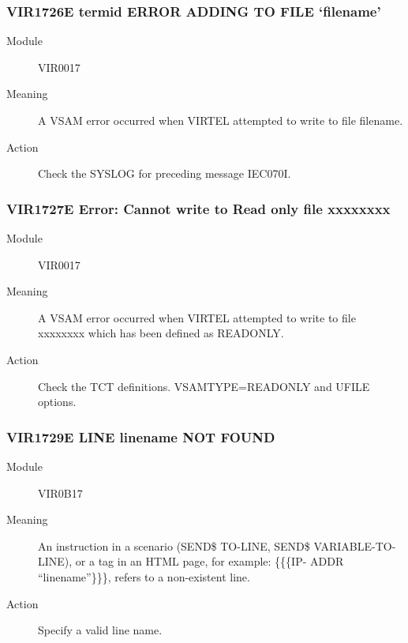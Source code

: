 \documentclass[letterpaper,10pt,english]{sphinxmanual}
\begin{document}
\subsubsection{VIR1726E termid ERROR ADDING TO FILE ‘filename’}
\label{\detokenize{messages:vir1726e-termid-error-adding-to-file-filename}}\begin{description}
\item[{Module}] \leavevmode
VIR0017

\item[{Meaning}] \leavevmode
A VSAM error occurred when VIRTEL attempted to write to file filename.

\item[{Action}] \leavevmode
Check the SYSLOG for preceding message IEC070I.

\end{description}


\subsubsection{VIR1727E Error: Cannot write to Read only file xxxxxxxx}
\label{\detokenize{messages:vir1727e-error-cannot-write-to-read-only-file-xxxxxxxx}}\begin{description}
\item[{Module}] \leavevmode
VIR0017

\item[{Meaning}] \leavevmode
A VSAM error occurred when VIRTEL attempted to write to file xxxxxxxx which has been defined as READONLY.

\item[{Action}] \leavevmode
Check the TCT definitions. VSAMTYPE=READONLY and UFILE options.

\end{description}


\subsubsection{VIR1729E LINE linename NOT FOUND}
\label{\detokenize{messages:vir1729e-line-linename-not-found}}\begin{description}
\item[{Module}] \leavevmode
VIR0B17

\item[{Meaning}] \leavevmode
An instruction in a scenario (SEND\$ TO-LINE, SEND\$ VARIABLE-TO-LINE), or a tag in an HTML page, for example: \{\{\{IP- ADDR “linename”\}\}\}, refers to a non-existent line.

\item[{Action}] \leavevmode
Specify a valid line name.

\end{description}
\end{document}
